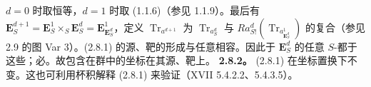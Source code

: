 $d=0$ 时取恒等，$d=1$ 时取 (1.1.6)（参见 1.1.9）。最后有 $\mathbf E^{d+1}_S=\mathbf E^1_S\times_S\mathbf E^d_S=\mathbf E^1_{\mathbf E^d_S}$，定义 $\operatorname{Tr}_{a^{d+1}}$ 为 $\operatorname{Tr}_{a^d_S}$ 与 $Ra^d_{S!}(\operatorname{Tr}_{a^1_{\mathbf E^d_S}})$ 的复合（参见 2.9 的图 Var 3）。(2.8.1) 的源、靶的形成与任意相容。因此于 $\mathbf E^d_S$ 的任意 $S$-都于这些；必。故包含在群中的坐标在其源、靶上。
\textbf{2.8.2。} (2.8.1) 在坐标置换下不变。这也可利用杯积解释 (2.8.1) 来验证（XVII 5.4.2.2、5.4.3.5）。
